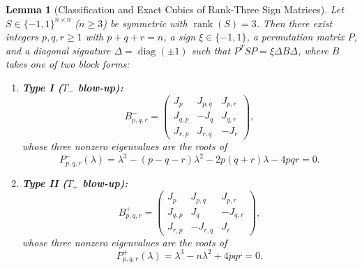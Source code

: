 \documentclass[11pt,reqno]{article}
\newtheorem{lemma}[theorem]{Lemma}
\theoremstyle{definition}
\newcommand{\diag}{\operatorname{diag}}
\newcommand{\rank}{\operatorname{rank}}
\begin{document}
\begin{lemma}[Classification and Exact Cubics of Rank-Three Sign Matrices]\label{lem:rank3-class}
Let $S \in \{-1, 1\}^{n \times n}$ ($n \ge 3$) be symmetric with $\rank(S) = 3$. Then there exist integers $p, q, r \ge 1$ with $p + q + r = n$, a sign $\xi \in \{-1, 1\}$, a permutation matrix $P$, and a diagonal signature $\Delta = \diag(\pm 1)$ such that $P^T S P = \xi \Delta B \Delta$, where $B$ takes one of two block forms:
\begin{enumerate}
    \item \textbf{Type I ($T_-$ blow-up):}
    \[
    B^-_{p,q,r} = \begin{pmatrix} J_p & J_{p,q} & J_{p,r} \\ J_{q,p} & -J_q & J_{q,r} \\ J_{r,p} & J_{r,q} & -J_r \end{pmatrix},
    \]
    whose three nonzero eigenvalues are the roots of
    \begin{equation}\label{eq:cubic-minus}
    P^-_{p,q,r}(\lambda) = \lambda^3 - (p - q - r)\lambda^2 - 2p(q+r)\lambda - 4pqr = 0.
    \end{equation}
    \item \textbf{Type II ($T_+$ blow-up):}
    \[
    B^+_{p,q,r} = \begin{pmatrix} J_p & J_{p,q} & J_{p,r} \\ J_{q,p} & J_q & -J_{q,r} \\ J_{r,p} & -J_{r,q} & J_r \end{pmatrix},
    \]
    whose three nonzero eigenvalues are the roots of
    \begin{equation}\label{eq:cubic-plus}
    P^+_{p,q,r}(\lambda) = \lambda^3 - n\lambda^2 + 4pqr = 0.
    \end{equation}
\end{enumerate}
\end{lemma}
\end{document}
